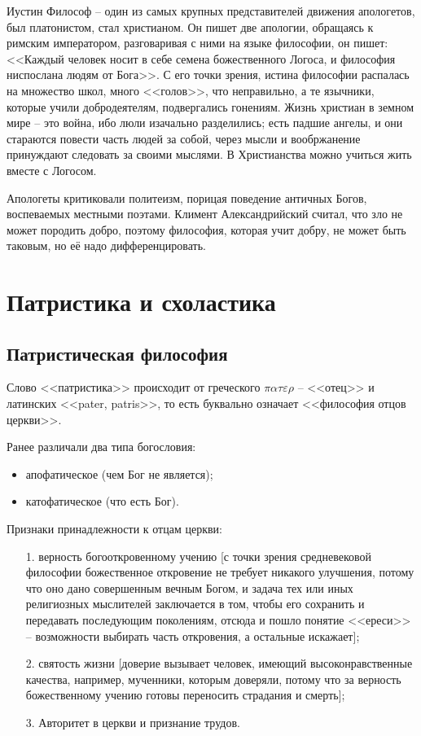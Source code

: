 \documentclass[a4paper, 12pt]{book} %
\begin{document}
Иустин Философ -- один из самых крупных представителей движения апологетов, был платонистом, стал христианом. Он пишет две апологии, обращаясь к римским императором, разговаривая с ними на языке философии, он пишет: <<Каждый человек носит в себе семена божественного Логоса, и философия ниспослана людям от Бога>>. С его точки зрения, истина философии распалась на множество школ, много <<голов>>, что неправильно, а те язычники, которые учили добродеятелям, подвергались гонениям. Жизнь христиан в земном мире -- это война, ибо люли изачально разделились; есть падшие ангелы, и они стараются повести часть людей за собой, через мысли и вообржанение принуждают следовать за своими мыслями. В Христианства можно учиться жить вместе с Логосом. 

Апологеты критиковали политеизм, порицая поведение античных Богов, воспеваемых местными поэтами. Климент Александрийский считал, что зло не может породить добро, поэтому философия, которая учит добру, не может быть таковым, но её надо дифференцировать.

\section{Патристика и схоластика}

\subsection{Патристическая философия}
Слово <<патристика>> происходит от греческого $\pi \alpha \tau \varepsilon \rho$ -- <<отец>> и латинских <<pater, patris>>, то есть буквально означает <<философия отцов церкви>>.

Ранее различали два типа богословия:
\begin{itemize}
\item апофатическое (чем Бог не является);
\item катофатическое (что есть Бог).
\end{itemize}

Признаки принадлежности к отцам церкви:
\begin{itemize}
\item[1.] верность богооткровенному учению [с точки зрения средневековой философии божественное откровение не требует никакого улучшения, потому что оно дано совершенным вечным Богом, и задача тех или иных религиозных мыслителей заключается в том, чтобы его сохранить и передавать последующим поколениям, отсюда и пошло понятие <<ереси>> -- возможности выбирать часть откровения, а остальные искажает];
\item[2.] святость жизни [доверие вызывает человек, имеющий высоконравственные качества, например, мученники, которым доверяли, потому что за верность божественному учению готовы переносить страдания и смерть];
\item[3.] Авторитет в церкви и признание трудов.
\end{itemize}  
\end{document}
